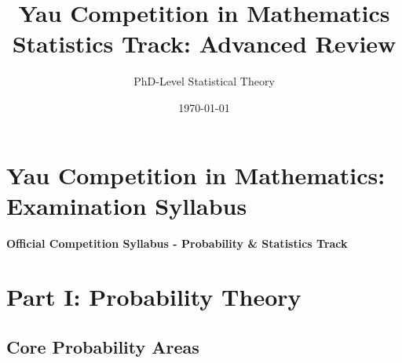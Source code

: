 \documentclass[12pt,a4paper]{article}
\title{\textbf{Yau Competition in Mathematics\\Statistics Track: Advanced Review}}
\author{PhD-Level Statistical Theory}
\date{\today}
\theoremstyle{remark}
\begin{document}
\maketitle
\tableofcontents
\newpage


\section*{Yau Competition in Mathematics: Examination Syllabus}

\begin{center}
\Large\textbf{Official Competition Syllabus - Probability \& Statistics Track}
\end{center}

\section*{Part I: Probability Theory}

\subsection*{Core Probability Areas}
\end{document}
